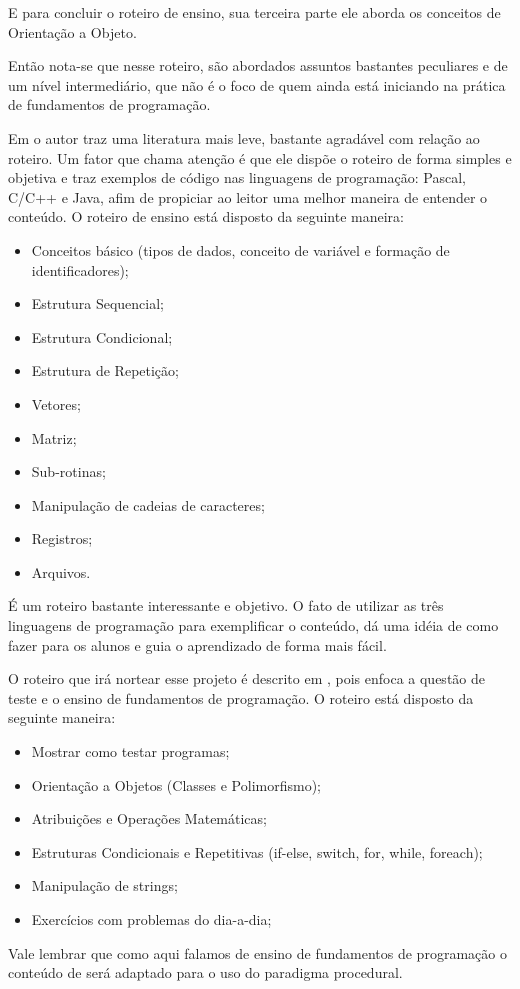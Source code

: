 \documentclass[pnumabnt,normaltoc,espacoumemeio,capchap]{abnt}
\begin{document}
\par E para concluir o roteiro de ensino, sua terceira parte ele aborda os conceitos de Orientação a Objeto.
\par Então nota-se que nesse roteiro, são abordados assuntos bastantes peculiares e de um nível intermediário, que não é o foco de quem ainda está iniciando na prática de fundamentos de programação.
\par Em  o autor traz uma literatura mais leve, bastante agradável com relação ao roteiro. Um fator que chama atenção é que ele dispõe o roteiro de forma simples e objetiva e traz exemplos de código nas linguagens de programação: Pascal, C/C++ e Java, afim de propiciar ao leitor uma melhor maneira de entender o conteúdo. O roteiro de ensino está disposto da seguinte maneira:
\begin{itemize}
\item Conceitos básico (tipos de dados, conceito de variável e formação de identificadores);
\item Estrutura Sequencial;
\item Estrutura Condicional;
\item Estrutura de Repetição;
\item Vetores;
\item Matriz;
\item Sub-rotinas;
\item Manipulação de cadeias de caracteres;
\item Registros;
\item Arquivos.
\end{itemize}
\par É um roteiro bastante interessante e objetivo. O fato de utilizar as três linguagens de programação para exemplificar o conteúdo, dá uma idéia de como fazer para os alunos e guia o aprendizado de forma mais fácil.
\par O roteiro que irá nortear esse projeto é descrito em , pois enfoca a questão de teste e o ensino de fundamentos de programação. O roteiro está disposto da seguinte maneira:
\begin{itemize}
\item Mostrar como testar programas;
\item Orientação a Objetos (Classes e Polimorfismo);
\item Atribuições e Operações Matemáticas;
\item Estruturas Condicionais e Repetitivas (if-else, switch, for, while, foreach);
\item Manipulação de strings;
\item Exercícios com problemas do dia-a-dia;
\end{itemize}
\par Vale lembrar que como aqui falamos de ensino de fundamentos de programação o conteúdo de  será adaptado para o uso do paradigma procedural.
\end{document}
